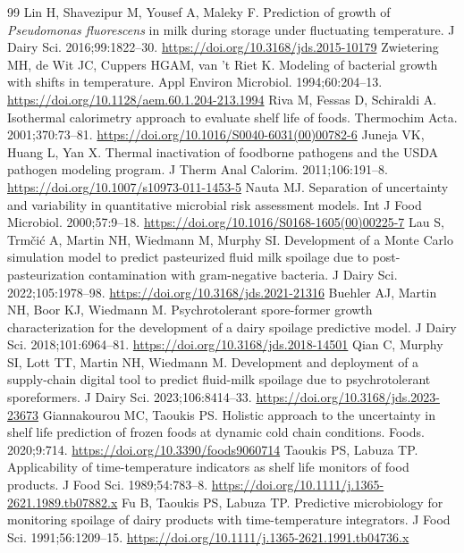 {\begin{thebibliography}{99}
 Lin H, Shavezipur M, Yousef A, Maleky F. Prediction of growth of \textit{Pseudomonas fluorescens} in milk during storage under fluctuating temperature. J Dairy Sci. 2016;99:1822--30. \url{https://doi.org/10.3168/jds.2015-10179}
 Zwietering MH, de Wit JC, Cuppers HGAM, van 't Riet K. Modeling of bacterial growth with shifts in temperature. Appl Environ Microbiol. 1994;60:204--13. \url{https://doi.org/10.1128/aem.60.1.204-213.1994}
 Riva M, Fessas D, Schiraldi A. Isothermal calorimetry approach to evaluate shelf life of foods. Thermochim Acta. 2001;370:73--81. \url{https://doi.org/10.1016/S0040-6031(00)00782-6}
 Juneja VK, Huang L, Yan X. Thermal inactivation of foodborne pathogens and the USDA pathogen modeling program. J Therm Anal Calorim. 2011;106:191--8. \url{https://doi.org/10.1007/s10973-011-1453-5}
 Nauta MJ. Separation of uncertainty and variability in quantitative microbial risk assessment models. Int J Food Microbiol. 2000;57:9--18. \url{https://doi.org/10.1016/S0168-1605(00)00225-7}
 Lau S, Trmčić A, Martin NH, Wiedmann M, Murphy SI. Development of a Monte Carlo simulation model to predict pasteurized fluid milk spoilage due to post-pasteurization contamination with gram-negative bacteria. J Dairy Sci. 2022;105:1978--98. \url{https://doi.org/10.3168/jds.2021-21316}
 Buehler AJ, Martin NH, Boor KJ, Wiedmann M. Psychrotolerant spore-former growth characterization for the development of a dairy spoilage predictive model. J Dairy Sci. 2018;101:6964--81. \url{https://doi.org/10.3168/jds.2018-14501}
 Qian C, Murphy SI, Lott TT, Martin NH, Wiedmann M. Development and deployment of a supply-chain digital tool to predict fluid-milk spoilage due to psychrotolerant sporeformers. J Dairy Sci. 2023;106:8414--33. \url{https://doi.org/10.3168/jds.2023-23673}
 Giannakourou MC, Taoukis PS. Holistic approach to the uncertainty in shelf life prediction of frozen foods at dynamic cold chain conditions. Foods. 2020;9:714. \url{https://doi.org/10.3390/foods9060714}
 Taoukis PS, Labuza TP. Applicability of time-temperature indicators as shelf life monitors of food products. J Food Sci. 1989;54:783--8. \url{https://doi.org/10.1111/j.1365-2621.1989.tb07882.x}
 Fu B, Taoukis PS, Labuza TP. Predictive microbiology for monitoring spoilage of dairy products with time-temperature integrators. J Food Sci. 1991;56:1209--15. \url{https://doi.org/10.1111/j.1365-2621.1991.tb04736.x}

\end{thebibliography}}
